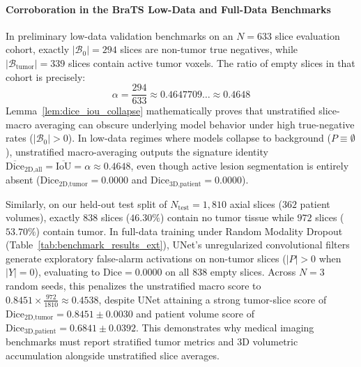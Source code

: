 \documentclass{article}
\begin{document}
\paragraph{Corroboration in the BraTS Low-Data and Full-Data Benchmarks}
In preliminary low-data validation benchmarks on an $N = 633$ slice evaluation cohort, exactly $|\mathcal{B}_0| = 294$ slices are non-tumor true negatives, while $|\mathcal{B}_{\text{tumor}}| = 339$ slices contain active tumor voxels. The ratio of empty slices in that cohort is precisely:
\begin{equation}
    \alpha = \frac{294}{633} \approx 0.4647709 \dots \approx \mathbf{0.4648}
\end{equation}
Lemma~\ref{lem:dice_iou_collapse} mathematically proves that unstratified slice-macro averaging can obscure underlying model behavior under high true-negative rates ($|\mathcal{B}_0| > 0$). In low-data regimes where models collapse to background ($P \equiv \emptyset$), unstratified macro-averaging outputs the signature identity $\overline{\text{Dice}}_{\text{2D,all}} = \overline{\text{IoU}} = \alpha \approx 0.4648$, even though active lesion segmentation is entirely absent ($\text{Dice}_{\text{2D,tumor}} = 0.0000$ and $\text{Dice}_{\text{3D,patient}} = 0.0000$). 

Similarly, on our held-out test split of $N_{\text{test}} = 1,810$ axial slices ($362$ patient volumes), exactly $838$ slices ($46.30\%$) contain no tumor tissue while $972$ slices ($53.70\%$) contain tumor. In full-data training under Random Modality Dropout (Table~\ref{tab:benchmark_results_ext}), UNet's unregularized convolutional filters generate exploratory false-alarm activations on non-tumor slices ($|P| > 0$ when $|Y| = 0$), evaluating to $\text{Dice} = 0.0000$ on all $838$ empty slices. Across $N=3$ random seeds, this penalizes the unstratified macro score to $0.8451 \times \frac{972}{1810} \approx 0.4538$, despite UNet attaining a strong tumor-slice score of $\text{Dice}_{\text{2D,tumor}} = 0.8451 \pm 0.0030$ and patient volume score of $\text{Dice}_{\text{3D,patient}} = 0.6841 \pm 0.0392$. This demonstrates why medical imaging benchmarks must report stratified tumor metrics and 3D volumetric accumulation alongside unstratified slice averages.
\end{document}
